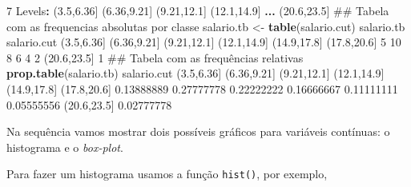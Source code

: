 \documentclass[10pt,a4paper]{book}
\newenvironment{Shaded}{\begin{snugshade}}{\end{snugshade}}
\newcommand{\KeywordTok}[1]{\textcolor[rgb]{0.13,0.29,0.53}{\textbf{#1}}}
\newcommand{\DecValTok}[1]{\textcolor[rgb]{0.00,0.00,0.81}{#1}}
\newcommand{\FloatTok}[1]{\textcolor[rgb]{0.00,0.00,0.81}{#1}}
\newcommand{\StringTok}[1]{\textcolor[rgb]{0.31,0.60,0.02}{#1}}
\newcommand{\OperatorTok}[1]{\textcolor[rgb]{0.81,0.36,0.00}{\textbf{#1}}}
\newcommand{\NormalTok}[1]{#1}
\begin{document}
\begin{Shaded}
\begin{Highlighting}[]
\DecValTok{7}\NormalTok{ Levels}\OperatorTok{:}\StringTok{ }\NormalTok{(}\FloatTok{3.5}\NormalTok{,}\FloatTok{6.36}\NormalTok{] (}\FloatTok{6.36}\NormalTok{,}\FloatTok{9.21}\NormalTok{] (}\FloatTok{9.21}\NormalTok{,}\FloatTok{12.1}\NormalTok{] (}\FloatTok{12.1}\NormalTok{,}\FloatTok{14.9}\NormalTok{] }\KeywordTok{...}\NormalTok{ (}\FloatTok{20.6}\NormalTok{,}\FloatTok{23.5}\NormalTok{]}
\NormalTok{## Tabela com as frequencias absolutas por classe}
\NormalTok{salario.tb <-}\StringTok{ }\KeywordTok{table}\NormalTok{(salario.cut)}
\NormalTok{salario.tb}
\NormalTok{salario.cut}
\NormalTok{ (}\FloatTok{3.5}\NormalTok{,}\FloatTok{6.36}\NormalTok{] (}\FloatTok{6.36}\NormalTok{,}\FloatTok{9.21}\NormalTok{] (}\FloatTok{9.21}\NormalTok{,}\FloatTok{12.1}\NormalTok{] (}\FloatTok{12.1}\NormalTok{,}\FloatTok{14.9}\NormalTok{] (}\FloatTok{14.9}\NormalTok{,}\FloatTok{17.8}\NormalTok{] (}\FloatTok{17.8}\NormalTok{,}\FloatTok{20.6}\NormalTok{] }
          \DecValTok{5}          \DecValTok{10}           \DecValTok{8}           \DecValTok{6}           \DecValTok{4}           \DecValTok{2} 
\NormalTok{(}\FloatTok{20.6}\NormalTok{,}\FloatTok{23.5}\NormalTok{] }
          \DecValTok{1} 
\NormalTok{## Tabela com as frequências relativas}
\KeywordTok{prop.table}\NormalTok{(salario.tb)}
\NormalTok{salario.cut}
\NormalTok{ (}\FloatTok{3.5}\NormalTok{,}\FloatTok{6.36}\NormalTok{] (}\FloatTok{6.36}\NormalTok{,}\FloatTok{9.21}\NormalTok{] (}\FloatTok{9.21}\NormalTok{,}\FloatTok{12.1}\NormalTok{] (}\FloatTok{12.1}\NormalTok{,}\FloatTok{14.9}\NormalTok{] (}\FloatTok{14.9}\NormalTok{,}\FloatTok{17.8}\NormalTok{] (}\FloatTok{17.8}\NormalTok{,}\FloatTok{20.6}\NormalTok{] }
 \FloatTok{0.13888889}  \FloatTok{0.27777778}  \FloatTok{0.22222222}  \FloatTok{0.16666667}  \FloatTok{0.11111111}  \FloatTok{0.05555556} 
\NormalTok{(}\FloatTok{20.6}\NormalTok{,}\FloatTok{23.5}\NormalTok{] }
 \FloatTok{0.02777778} 
\end{Highlighting}
\end{Shaded}

Na sequência vamos mostrar dois possíveis gráficos para variáveis
contínuas: o histograma e o \emph{box-plot}.

Para fazer um histograma usamos a função \texttt{hist()}, por exemplo,

\begin{Shaded}
\end{Shaded}
\end{document}
